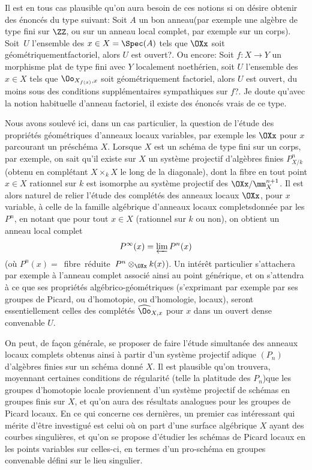 Il est en tous cas plausible qu'on aura besoin de ces notions si on d\'esire obtenir des \'enonc\'es du type suivant: Soit $A$ un \og bon anneau\fg (par exemple une alg\`ebre de type fini sur $\ZZ$, ou sur un anneau local complet, par exemple sur un corps). Soit~$U$ l'ensemble des $x\in X=\Spec(A)$ tels que $\OXx$ soit \og g\'eom\'etriquement\pageoriginale factoriel\fg, alors $U$ est ouvert?. Ou encore: Soit $f\colon X\to Y$ un morphisme plat de type fini avec $Y$ localement noeth\'erien, soit $U$ l'ensemble des $x\in X$ tels que $\Oo_{X_{f(x)}, x}$ soit \og g\'eom\'etriquement factoriel\fg, alors $U$ est ouvert, du moins sous des conditions suppl\'ementaires sympathiques sur $f$?. Je doute qu'avec la notion habituelle d'anneau factoriel, il existe des \'enonc\'es vrais de ce type.

Nous avons soulev\'e ici, dans un cas particulier, la question de l'\'etude des propri\'et\'es g\'eom\'etriques d'anneaux locaux \og variables\fg, par exemple les $\OXx$ pour $x$ parcourant un pr\'esch\'ema $X$. Lorsque $X$ est un sch\'ema de type fini sur un corps, par exemple, on sait qu'il existe sur $X$ un syst\`eme projectif d'alg\`ebres finies $P^n_{X/k}$ (obtenu en compl\'etant $X\times_k X$ le long de la diagonale), dont la fibre en tout point $x\in X$ rationnel sur $k$ est isomorphe au syst\`eme projectif des $\OXx/\mm_X^{n+1}$. Il est alors naturel de relier l'\'etude des compl\'et\'es des anneaux locaux $\OXx$, pour $x$ variable, \`a celle de la \og famille alg\'ebrique d'anneaux locaux complets\fg donn\'ee par les $P^n$, en notant que pour tout $x\in X$ (rationnel sur $k$ ou non), on obtient un anneau local complet
$$
P^{\infty}(x)=\varprojlim P^n(x)
$$
(o\`u $P^n(x)=$~fibre~r\'eduite~$P^n\otimes_{\OXx}k(x)$). Un int\'er\^et particulier s'attachera par exemple \`a l'anneau complet associ\'e ainsi au point g\'en\'erique, et on s'attendra \`a ce que ses propri\'et\'es alg\'ebrico-g\'eom\'etriques (s'exprimant par exemple par ses groupes de Picard, ou d'homotopie, ou d'homologie, locaux), seront essentiellement celles des compl\'et\'es $\widehat{\Oo}_{X, x}$ pour $x$ dans un ouvert dense convenable $U$.

On peut, de fa\c con g\'en\'erale, se proposer de faire l'\'etude simultan\'ee des anneaux locaux complets obtenus ainsi \`a partir d'un syst\`eme projectif adique $(P_n)$ d'alg\`ebres finies sur un sch\'ema donn\'e $X$. Il est plausible qu'on trouvera, moyennant certaines conditions de r\'egularit\'e (telle la platitude des $P_n$)\pageoriginale que les groupes d'homotopie locale proviennent d'un syst\`eme projectif de sch\'emas en groupes finis sur $X$, et qu'on aura des r\'esultats analogues pour les groupes de Picard locaux. En ce qui concerne ces derni\`eres, un premier cas int\'eressant qui m\'erite d'\^etre investigu\'e est celui o\`u on part d'une surface alg\'ebrique $X$ ayant des courbes singuli\`eres, et qu'on se propose d'\'etudier les sch\'emas de Picard locaux en les points variables sur celles-ci, en termes d'un pro-sch\'ema en groupes convenable d\'efini sur le lieu singulier.

